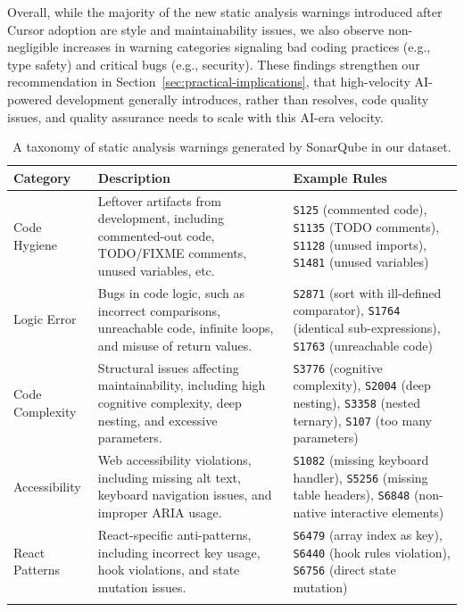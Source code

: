Overall, while the majority of the new static analysis warnings introduced after Cursor adoption are style and maintainability issues, we also observe non-negligible increases in warning categories signaling bad coding practices (e.g., type safety) and critical bugs (e.g., security).
These findings strengthen our recommendation in Section~\ref{sec:practical-implications}, that high-velocity AI-powered development generally introduces, rather than resolves, code quality issues, and quality assurance needs to scale with this AI-era velocity. 

\begin{table}
\centering
\caption{A taxonomy of static analysis warnings generated by SonarQube in our dataset.}
\label{tab:warning-taxonomy}
\scriptsize
\begin{tabular}{@{}lp{6.25cm}p{6.25cm}@{}}
\toprule
\textbf{Category} & \textbf{Description} & \textbf{Example Rules} \\
\midrule

Code Hygiene & 
Leftover artifacts from development, including commented-out code, TODO/FIXME comments, unused variables, etc. &
\texttt{S125} (commented code), \texttt{S1135} (TODO comments), \texttt{S1128} (unused imports), \texttt{S1481} (unused variables) \\
\addlinespace

Logic Error & 
Bugs in code logic, such as incorrect comparisons, unreachable code, infinite loops, and misuse of return values. &
\texttt{S2871} (sort with ill-defined comparator), \texttt{S1764} (identical sub-expressions), \texttt{S1763} (unreachable code) \\ %
\addlinespace

Code Complexity & 
Structural issues affecting maintainability, including high cognitive complexity, deep nesting, and excessive parameters. &
\texttt{S3776} (cognitive complexity), \texttt{S2004} (deep nesting), \texttt{S3358} (nested ternary), \texttt{S107} (too many parameters) \\
\addlinespace

Accessibility & 
Web accessibility violations, including missing alt text, keyboard navigation issues, and improper ARIA usage. &
\texttt{S1082} (missing keyboard handler), \texttt{S5256} (missing table headers), \texttt{S6848} (non-native interactive elements) \\
\addlinespace

React Patterns & 
React-specific anti-patterns, including incorrect key usage, hook violations, and state mutation issues. &
\texttt{S6479} (array index as key), \texttt{S6440} (hook rules violation), \texttt{S6756} (direct state mutation) \\
\addlinespace


\end{tabular}
\end{table}

